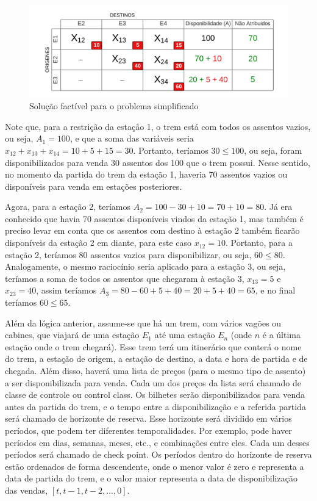 \begin{figure}[!ht]
	\begin{center}
		\includegraphics[scale=0.4]{img/fig2.png}
		\caption{Solução factível para o problema simplificado}
		\label{fig: fig2}
	\end{center}
\end{figure}

Note que, para a restrição da estação 1, o trem está com todos os assentos vazios, ou seja, \(A_1=100\), e que a soma das variáveis seria \(x_{12} + x_{13} + x_{14} = 10 + 5 + 15 = 30\). Portanto, teríamos \(30 \leq 100\), ou seja, foram disponibilizados para venda 30 assentos dos 100 que o trem possui. Nesse sentido, no momento da partida do trem da estação 1, haveria 70 assentos vazios ou disponíveis para venda em estações posteriores.

Agora, para a estação 2, teríamos \(A_2 = 100 - 30 + 10 = 70 + 10 = 80\). Já era conhecido que havia 70 assentos disponíveis vindos da estação 1, mas também é preciso levar em conta que os assentos com destino à estação 2 também ficarão disponíveis da estação 2 em diante, para este caso \(x_{12} = 10\). Portanto, para a estação 2, teríamos 80 assentos vazios para disponibilizar, ou seja, \(60 \leq 80\). Analogamente, o mesmo raciocínio seria aplicado para a estação 3, ou seja, teríamos a soma de todos os assentos que chegaram à estação 3, \(x_{13} = 5\) e \(x_{23} = 40\), assim teríamos \(A_3 = 80 - 60 + 5 + 40 = 20 + 5 + 40 = 65\), e no final teríamos \(60 \leq 65\).

Além da lógica anterior, assume-se que há um trem, com vários vagões ou cabines, que viajará de uma estação $E_1$ até uma estação $E_n$ (onde $n$ é a última estação onde o trem chegará). Esse trem terá um itinerário que conterá o nome do trem, a estação de origem, a estação de destino, a data e hora de partida e de chegada. Além disso, haverá uma lista de preços (para o mesmo tipo de assento) a ser disponibilizada para venda. Cada um dos preços da lista será chamado de classe de controle ou control class. Os bilhetes serão disponibilizados para venda antes da partida do trem, e o tempo entre a disponibilização e a referida partida será chamado de horizonte de reserva. Esse horizonte será dividido em vários períodos, que podem ter diferentes temporalidades. Por exemplo, pode haver períodos em dias, semanas, meses, etc., e combinações entre eles. Cada um desses períodos será chamado de check point. Os períodos dentro do horizonte de reserva estão ordenados de forma descendente, onde o menor valor é zero e representa a data de partida do trem, e o valor maior representa a data de disponibilização das vendas, $[ t,t-1,t-2,...,0]$.

